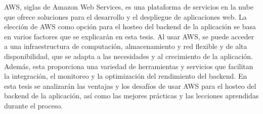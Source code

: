 AWS, siglas de Amazon Web Services, es una plataforma de servicios en la nube que ofrece soluciones para el desarrollo y el despliegue de aplicaciones web. La elección de AWS como opción para el hosteo del backend de la aplicación se basa en varios factores que se explicarán en esta tesis. Al usar AWS, se puede acceder a una infraestructura de computación, almacenamiento y red flexible y de alta disponibilidad, que se adapta a las necesidades y al crecimiento de la aplicación. Además, esta proporciona una variedad de herramientas y servicios que facilitan la integración, el monitoreo y la optimización del rendimiento del backend. En esta tesis se analizarán las ventajas y los desafíos de usar AWS para el hosteo del backend de la aplicación, así como las mejores prácticas y las lecciones aprendidas durante el proceso.
